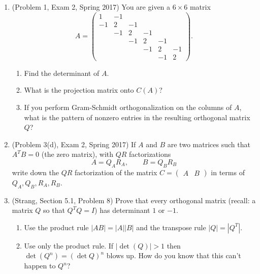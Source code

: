 \documentclass[11pt]{article}
\begin{document}
\begin{enumerate}


\item (Problem 1, Exam 2, Spring 2017) You are given a $6 \times 6$ matrix
\[A = \begin{pmatrix} 1 & -1 &  &  &  & \\ -1 & 2 & -1 &  &  &  \\  & -1 & 2 & -1 &  &  \\  &  & -1 & 2 & -1 &  \\  &  &  & -1 & 2 & -1 \\  &  &  &  & -1 & 2 \end{pmatrix}.\]

\begin{enumerate}

\item Find the determinant of $A$.

\item What is the projection matrix onto $C(A)$?

\item If you perform Gram-Schmidt orthogonalization on the columns of $A$, what is the pattern of nonzero entries in the resulting orthogonal matrix $Q$?  

\end{enumerate}


\item (Problem 3(d), Exam 2, Spring 2017) If $A$ and $B$ are two matrices such that $A^TB = 0$ (the zero matrix), with $QR$ factorizations
\[A = Q_AR_A, \qquad B = Q_BR_B \]
write down the $QR$ factorization of the matrix $C = \begin{pmatrix} A & B \end{pmatrix} $ in terms of $Q_A, Q_B, R_A, R_B$.


\item (Strang, Section 5.1, Problem 8) Prove that every orthogonal matrix (recall: a matrix $Q$ so that $Q^TQ = I$) has determinant $1$ or $-1$.

\begin{enumerate}

\item Use the product rule $|AB| = |A||B|$ and the transpose rule $|Q| = |Q^T|$.


\item Use only the product rule.  If $|\det(Q)| > 1$ then $\det (Q^n) = (\det Q)^n$ blows up.  How do you know that this can't happen to $Q^n$?

\end{enumerate}


\end{enumerate}
\end{document}
